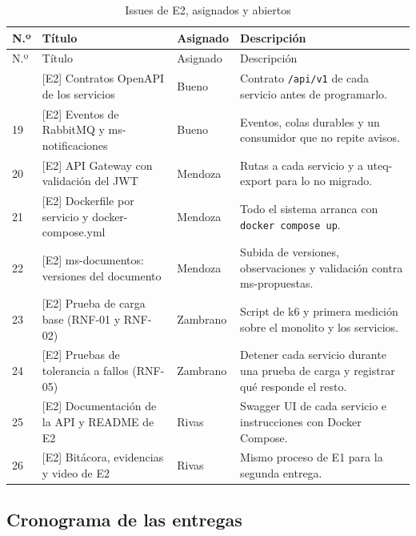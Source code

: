 \begingroup
\footnotesize
\setlength{\tabcolsep}{3pt}
\begin{longtable}{@{}L{0.8cm}L{6.0cm}L{1.6cm}L{6.6cm}@{}}
\caption{Issues de E2, asignados y abiertos}\label{tab:issues-e2}\\
\toprule
N.º & Título & Asignado & Descripción \\
\midrule
\endfirsthead
\toprule
N.º & Título & Asignado & Descripción \\
\midrule
\endhead
\bottomrule
{} & [E2] Contratos OpenAPI de los servicios & Bueno & Contrato \texttt{/api/v1} de cada servicio antes de programarlo. \\
19 & [E2] Eventos de RabbitMQ y ms-notificaciones & Bueno & Eventos, colas durables y un consumidor que no repite avisos. \\
20 & [E2] API Gateway con validación del JWT & Mendoza & Rutas a cada servicio y a uteq-export para lo no migrado. \\
21 & [E2] Dockerfile por servicio y docker-compose.yml & Mendoza & Todo el sistema arranca con \texttt{docker compose up}. \\
22 & [E2] ms-documentos: versiones del documento & Mendoza & Subida de versiones, observaciones y validación contra ms-propuestas. \\
23 & [E2] Prueba de carga base (RNF-01 y RNF-02) & Zambrano & Script de k6 y primera medición sobre el monolito y los servicios. \\
24 & [E2] Pruebas de tolerancia a fallos (RNF-05) & Zambrano & Detener cada servicio durante una prueba de carga y registrar qué responde el resto. \\
25 & [E2] Documentación de la API y README de E2 & Rivas & Swagger UI de cada servicio e instrucciones con Docker Compose. \\
26 & [E2] Bitácora, evidencias y video de E2 & Rivas & Mismo proceso de E1 para la segunda entrega. \\
\end{longtable}
\endgroup

\subsection{Cronograma de las entregas}


